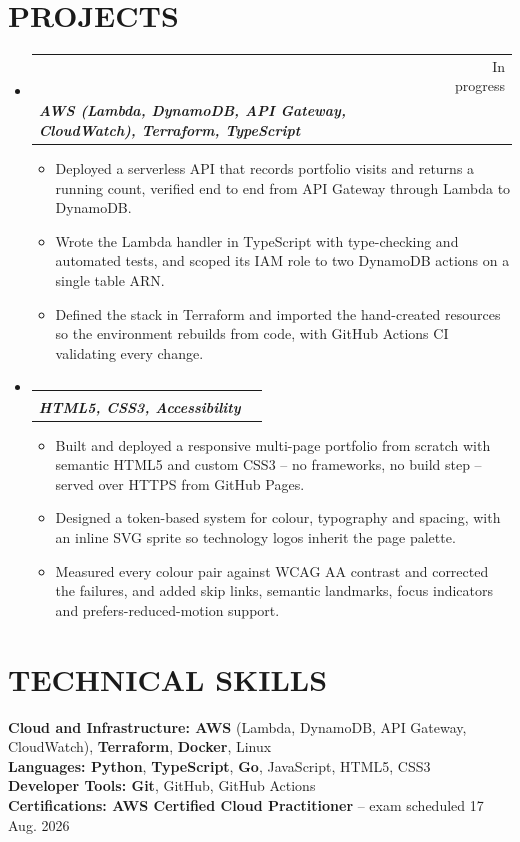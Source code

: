 \documentclass[letterpaper,11pt]{article}
\makeatletter
\newcommand{\myuline}[1]{%
  \uline{\phantom{#1}}%
  \llap{\contour{white}{#1}}%
}
\newcommand{\resumeItem}[1]{
  \item\small{{#1 \vspace{-1pt}}}
}
\newcommand{\resumeSubheading}[4]{
  \vspace{-1pt}\item
  \begin{tabular*}{\textwidth}[t]{l@{\extracolsep{\fill}}r}
    \textbf{#1} & {\color{dark-grey}\small #2}\vspace{1pt}\\
    \textit{#3} & {\color{dark-grey}\small #4}\\
  \end{tabular*}\vspace{-4pt}
}
\newcommand{\resumeSubHeadingListStart}{\begin{itemize}[leftmargin=0in,label={}]}
\newcommand{\resumeSubHeadingListEnd}{\end{itemize}}
\newcommand{\resumeItemListStart}{\begin{itemize}}
\newcommand{\resumeItemListEnd}{\end{itemize}\vspace{-3pt}}
\makeatother
\begin{document}
\section{PROJECTS}
\resumeSubHeadingListStart
  \resumeSubheading
    {\href{https://github.com/uwazieshiloh47-bot/portfolio-visitor-analytics}{\myuline{Portfolio Visitor Analytics}}}{In progress}
    {\textbf{AWS (Lambda, DynamoDB, API Gateway, CloudWatch), Terraform, TypeScript}}{\href{https://github.com/uwazieshiloh47-bot/portfolio-visitor-analytics}{\myuline{GitHub Repository}}}
  \resumeItemListStart
    \resumeItem{Deployed a serverless API that records portfolio visits and returns a running count, verified end to end from API Gateway through Lambda to DynamoDB.}
    \resumeItem{Wrote the Lambda handler in TypeScript with type-checking and automated tests, and scoped its IAM role to two DynamoDB actions on a single table ARN.}
    \resumeItem{Defined the stack in Terraform and imported the hand-created resources so the environment rebuilds from code, with GitHub Actions CI validating every change.}
  \resumeItemListEnd

  \resumeSubheading
    {\href{https://uwazieshiloh47-bot.github.io/shiloh-portfolio/}{\myuline{Personal Portfolio Website}}}{\href{https://uwazieshiloh47-bot.github.io/shiloh-portfolio/}{\myuline{Live Site}}}
    {\textbf{HTML5, CSS3, Accessibility}}{\href{https://github.com/uwazieshiloh47-bot/shiloh-portfolio}{\myuline{GitHub Repository}}}
  \resumeItemListStart
    \resumeItem{Built and deployed a responsive multi-page portfolio from scratch with semantic HTML5 and custom CSS3 -- no frameworks, no build step -- served over HTTPS from GitHub Pages.}
    \resumeItem{Designed a token-based system for colour, typography and spacing, with an inline SVG sprite so technology logos inherit the page palette.}
    \resumeItem{Measured every colour pair against WCAG AA contrast and corrected the failures, and added skip links, semantic landmarks, focus indicators and prefers-reduced-motion support.}
  \resumeItemListEnd
\resumeSubHeadingListEnd

\section{TECHNICAL SKILLS}
\begin{itemize}[leftmargin=0in,label={}]
  \small{\item{
    \textbf{Cloud and Infrastructure: AWS} (Lambda, DynamoDB, API Gateway, CloudWatch), \textbf{Terraform}, \textbf{Docker}, Linux \\[1mm]
    \textbf{Languages: Python}, \textbf{TypeScript}, \textbf{Go}, JavaScript, HTML5, CSS3 \\[1mm]
    \textbf{Developer Tools: Git}, GitHub, GitHub Actions \\[1mm]
    \textbf{Certifications: AWS Certified Cloud Practitioner} -- exam scheduled 17 Aug. 2026
  }}
\end{itemize}
\end{document}
